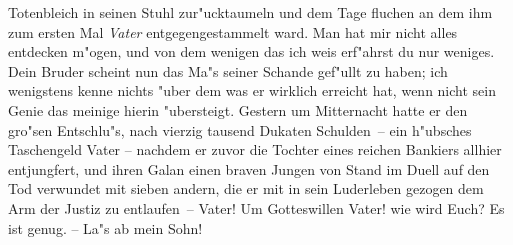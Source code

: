 \begin{drama}
\franspeaks {} \frqq Totenbleich in seinen Stuhl zur"ucktaumeln und dem Tage fluchen an dem ihm zum ersten Mal \emph{Vater} entgegengestammelt ward. Man hat mir nicht alles entdecken m"ogen, und von dem wenigen das ich weis erf"ahrst du nur weniges. Dein Bruder scheint nun das Ma"s seiner Schande gef"ullt zu haben; ich wenigstens kenne nichts "uber dem was er wirklich erreicht hat, wenn nicht sein Genie das meinige hierin "ubersteigt. Gestern um Mitternacht hatte er den gro"sen Entschlu"s, nach vierzig tausend Dukaten Schulden\flqq \ --  ein h"ubsches Taschengeld Vater -- \frqq nachdem er zuvor die Tochter eines reichen Bankiers allhier entjungfert, und ihren Galan einen braven Jungen von Stand im Duell auf den Tod verwundet mit sieben andern, die er mit in sein Luderleben gezogen dem Arm der Justiz zu entlaufen\flqq \ -- Vater! Um Gotteswillen Vater! wie wird Euch?
\moorspeaks Es ist genug. -- La"s ab mein Sohn!
\end{drama}

\endinput
